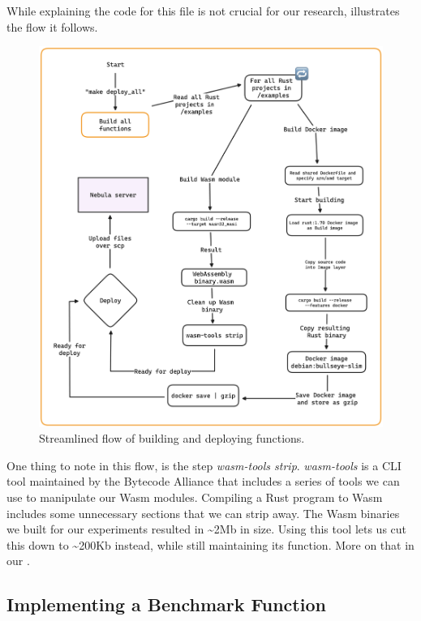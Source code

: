 \documentclass[
  table]{report}
\begin{document}
While explaining the code for this file is not crucial for our research,
 illustrates the flow it follows.

\begin{figure}[H]
\centering
  \includegraphics{assets/6-build_deploy_functions.png}
  \caption{Streamlined flow of building and deploying functions.}
  \label{fig:build_deploy_function}
\end{figure}

One thing to note in this flow, is the step \emph{wasm-tools strip}.
\emph{wasm-tools} is a CLI tool maintained by the Bytecode Alliance that
includes a series of tools we can use to manipulate our \ac{Wasm}
modules. Compiling a Rust program to \ac{Wasm} includes some unnecessary
sections that we can strip away. The \ac{Wasm} binaries we built for our
experiments resulted in \textasciitilde2Mb in size. Using this tool lets
us cut this down to \textasciitilde200Kb instead, while still
maintaining its function. More on that in our .

\subsection{Implementing a Benchmark Function}
\end{document}

